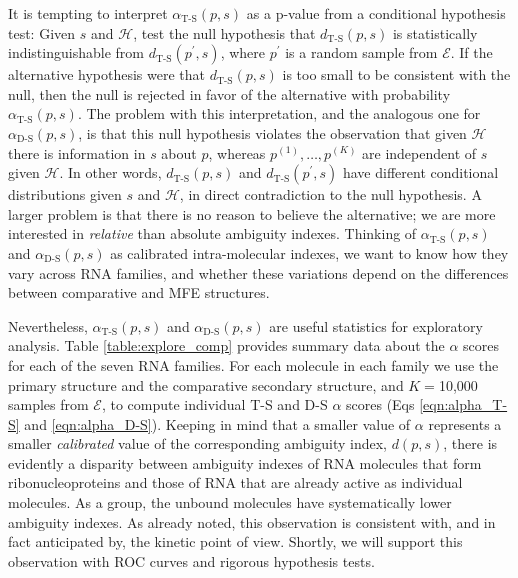 \documentclass[10pt,letterpaper]{article}
\begin{document}
It is tempting to interpret $\alpha_\text{T-S}(p,s)$ as a p-value from a conditional hypothesis test: Given $s$ and $\mathcal{H}$, test the null hypothesis that $d_\text{T-S}(p,s)$ is statistically indistinguishable from  
$d_\text{T-S}(p^\prime,s)$, where $p^\prime$ is a random sample from $\mathcal{E}$. If the alternative hypothesis were that $d_\text{T-S}(p,s)$ is too small to be consistent with the null,  then the null is rejected in favor of the alternative with probability $\alpha_\text{T-S}(p,s)$. The problem with this interpretation, and the analogous one for $\alpha_\text{D-S}(p,s)$, is that this null hypothesis violates the observation that given $\mathcal{H}$ there is information in $s$ about $p$, whereas  $p^{(1)},\ldots,p^{(K)}$ are independent of $s$ given $\mathcal{H}$. 
In other words, $d_\text{T-S}(p,s)$ and $d_\text{T-S}(p^\prime,s)$
have different conditional distributions given $s$ and $\mathcal{H}$, in direct contradiction to the null hypothesis.
A larger problem is that there is no reason to believe the alternative; we are more interested in {\em relative} than absolute ambiguity indexes. Thinking of  
$\alpha_\text{T-S}(p,s)$ and $\alpha_\text{D-S}(p,s)$ as calibrated intra-molecular indexes, we want to know how they vary across RNA families, and whether these variations depend on the differences between comparative and MFE structures.

Nevertheless, $\alpha_\text{T-S}(p,s)$ and $\alpha_\text{D-S}(p,s)$ are useful statistics for exploratory analysis.  Table \ref{table:explore_comp} provides summary data about the $\alpha$ scores for each of the seven RNA families. 
For each molecule in each family we use the primary structure and the comparative secondary structure, and $K=$10,000 samples from $\mathcal{E}$, to compute
individual T-S and D-S $\alpha$ scores (Eqs \ref{eqn:alpha_T-S} and \ref{eqn:alpha_D-S}). Keeping in mind that a smaller value of $\alpha$ represents a smaller {\em calibrated} value of the corresponding ambiguity index, $d(p,s)$, there is evidently a disparity between ambiguity indexes of RNA molecules that form ribonucleoproteins and those of RNA that are already active as individual molecules. As a group, the unbound molecules have systematically lower ambiguity indexes. As already noted, this observation is consistent with, and in fact anticipated by, the kinetic point of view. Shortly, we will support this observation with ROC curves and rigorous hypothesis tests.
\end{document}
